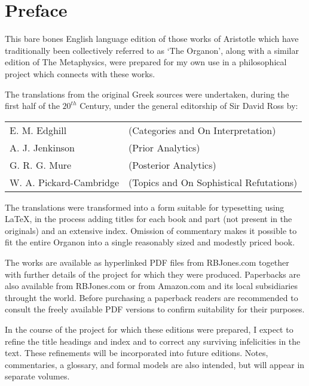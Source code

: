 \pagebreak

\chapter*{Preface}

This bare bones English language edition of those works of Aristotle which have traditionally been collectively referred to as `The Organon', along with a similar edition of The Metaphysics, were prepared for my own use in a philosophical project which connects with these works.
 
The translations from the original Greek sources were undertaken, during the first half of the \ensuremath{20^{th}} Century, under the general editorship of Sir David Ross by:

\vfill

\begin{centering}
\begin{tabular}{l l}
E. M. Edghill & (Categories and On Interpretation)\\
A. J. Jenkinson & (Prior Analytics)\\
G. R. G. Mure & (Posterior Analytics)\\
W. A. Pickard-Cambridge & (Topics and On Sophistical Refutations)
\end{tabular}
\end{centering}

\vfill

The translations were transformed into a form suitable for typesetting using {\LaTeX}, in the process adding titles for each book and part (not present in the originals) and an extensive index.
Omission of commentary makes it possible to fit the entire Organon into a single reasonably sized and modestly priced book.

The works are available as hyperlinked PDF files from RBJones.com together with further details of the project for which they were produced.
Paperbacks are also available from RBJones.com or from Amazon.com and its local subsidiaries throught the world. 
Before purchasing a paperback readers are recommended to consult the freely available PDF versions to confirm suitability for their purposes.

In the course of the project for which these editions were prepared, I expect to refine the title headings and index and to correct any surviving infelicities in the text.
These refinements will be incorporated into future editions.
Notes, commentaries, a glossary, and formal models are also intended, but will appear in separate volumes.

